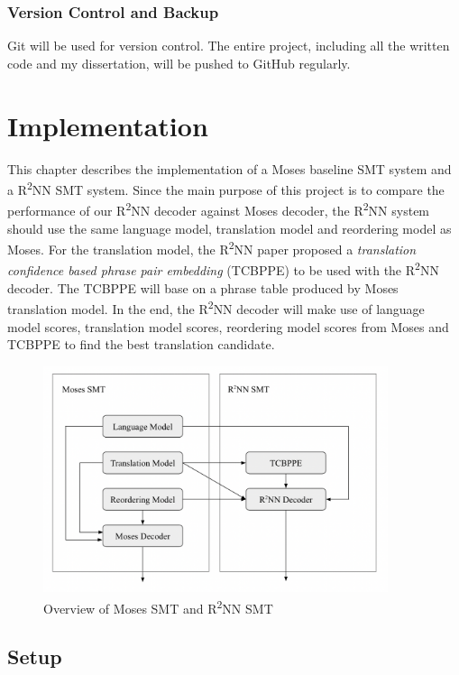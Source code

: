 \documentclass[12pt,a4paper,twoside,openright]{report}
\begin{document}
\subsection{Version Control and Backup}
Git will be used for version control. The entire project, including all the written code and my dissertation, will be pushed to GitHub regularly.

\chapter{Implementation} \label{implementation}
This chapter describes the implementation of a Moses baseline SMT system and a R\textsuperscript{2}NN SMT system. Since the main purpose of this project is to compare the performance of our R\textsuperscript{2}NN decoder against Moses decoder, the R\textsuperscript{2}NN system should use the same language model, translation model and reordering model as Moses. For the translation model, the R\textsuperscript{2}NN paper\cite{r2nn} proposed a \textit{translation confidence based phrase pair embedding} (TCBPPE) to be used with the R\textsuperscript{2}NN decoder. The TCBPPE will base on a phrase table produced by Moses translation model. In the end, the R\textsuperscript{2}NN decoder will make use of language model scores, translation model scores, reordering model scores from Moses and TCBPPE to find the best translation candidate.

\begin{figure}[ht]
\centering
\includegraphics[width=0.9\textwidth]{images/overview_moses_r2nn.png}
\caption{Overview of Moses SMT and R\textsuperscript{2}NN SMT}
\label{fig:moses_r2nn}
\end{figure}

\section{Setup}
\end{document}
